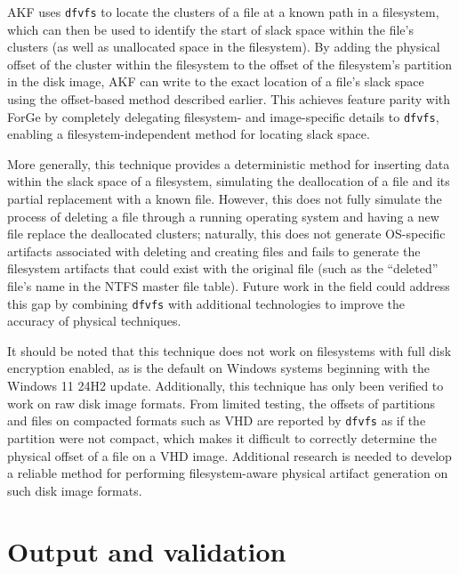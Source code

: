 \documentclass[letterpaper,12pt]{report}
\newcommand{\passthrough}[1]{#1}
\begin{document}
AKF uses \passthrough{\lstinline!dfvfs!} to locate the clusters of a
file at a known path in a filesystem, which can then be used to identify
the start of slack space within the file's clusters (as well as
unallocated space in the filesystem). By adding the physical offset of
the cluster within the filesystem to the offset of the filesystem's
partition in the disk image, AKF can write to the exact location of a
file's slack space using the offset-based method described earlier. This
achieves feature parity with ForGe by completely delegating filesystem-
and image-specific details to \passthrough{\lstinline!dfvfs!}, enabling
a filesystem-independent method for locating slack space.

More generally, this technique provides a deterministic method for
inserting data within the slack space of a filesystem, simulating the
deallocation of a file and its partial replacement with a known file.
However, this does not fully simulate the process of deleting a file
through a running operating system and having a new file replace the
deallocated clusters; naturally, this does not generate OS-specific
artifacts associated with deleting and creating files and fails to
generate the filesystem artifacts that could exist with the original
file (such as the ``deleted'' file's name in the NTFS master file
table). Future work in the field could address this gap by combining
\passthrough{\lstinline!dfvfs!} with additional technologies to improve
the accuracy of physical techniques.

It should be noted that this technique does not work on filesystems with
full disk encryption enabled, as is the default on Windows systems
beginning with the Windows 11 24H2 update. Additionally, this technique
has only been verified to work on raw disk image formats. From limited
testing, the offsets of partitions and files on compacted formats such
as VHD are reported by \passthrough{\lstinline!dfvfs!} as if the
partition were not compact, which makes it difficult to correctly
determine the physical offset of a file on a VHD image. Additional
research is needed to develop a reliable method for performing
filesystem-aware physical artifact generation on such disk image
formats.

\chapter{Output and validation}\label{chapter-five}

\hfill\break
\end{document}

